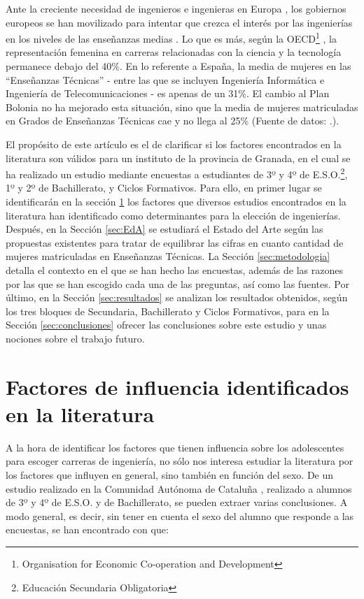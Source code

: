 \documentclass[runningheads,a4paper]{llncs}
\begin{document}
Ante la creciente necesidad de ingenieros e ingenieras en Europa \cite{gago2004europe}, los gobiernos europeos se han movilizado para intentar que crezca el interés por las ingenierías en los niveles de las enseñanzas medias \cite{Kearney2014}. Lo que es más, según la OECD\footnote{Organisation for Economic Co-operation and Development} \cite{OECD2006}, la representación femenina en carreras relacionadas con la ciencia y la tecnología permanece debajo del 40\%. En lo referente a España, la media de mujeres en las ``Enseñanzas Técnicas'' - entre las que se incluyen Ingeniería Informática e Ingeniería de Telecomunicaciones - es apenas de un 31\%. El cambio al Plan Bolonia \cite{fernandez2009plan} no ha mejorado esta situación, sino que la media de mujeres matriculadas en Grados de Enseñanzas Técnicas cae y no llega al 25\% (Fuente de datos: \cite{datos::uni}.).

El propósito de este artículo es el de clarificar si los factores encontrados en la literatura son válidos para un instituto de la provincia de Granada, en el cual se ha realizado un estudio mediante encuestas a estudiantes de 3º y 4º de E.S.O.\footnote{Educación Secundaria Obligatoria}, 1º y 2º de Bachillerato, y Ciclos Formativos. Para ello, en primer lugar se identificarán en la sección \ref{sec:factores} los factores que diversos estudios encontrados en la literatura han identificado como determinantes para la elección de ingenierías. Después, en la Sección \ref{sec:EdA} se estudiará el Estado del Arte según las propuestas existentes para tratar de equilibrar las cifras en cuanto cantidad de mujeres matriculadas en Enseñanzas Técnicas. La Sección \ref{sec:metodologia} detalla el contexto en el que se han hecho las encuestas, además de las razones por las que se han escogido cada una de las preguntas, así como las fuentes. Por último, en la Sección \ref{sec:resultados} se analizan los resultados obtenidos, según los tres bloques de Secundaria, Bachillerato y Ciclos Formativos, para en la Sección \ref{sec:conclusiones} ofrecer las conclusiones sobre este estudio y unas nociones sobre el trabajo futuro.

\section{Factores de influencia identificados en la literatura}
\label{sec:factores}

A la hora de identificar los factores que tienen influencia sobre los adolescentes para escoger carreras de ingeniería, no sólo nos interesa estudiar la literatura por los factores que influyen en general, sino también en función del sexo. De un estudio realizado en la Comunidad Autónoma de Cataluña \cite{everis2012}, realizado a alumnos de 3º y 4º de E.S.O. y de Bachillerato, se pueden extraer varias conclusiones. A modo general, es decir, sin tener en cuenta el sexo del alumno que responde a las encuestas, se han encontrado con que:
\end{document}
